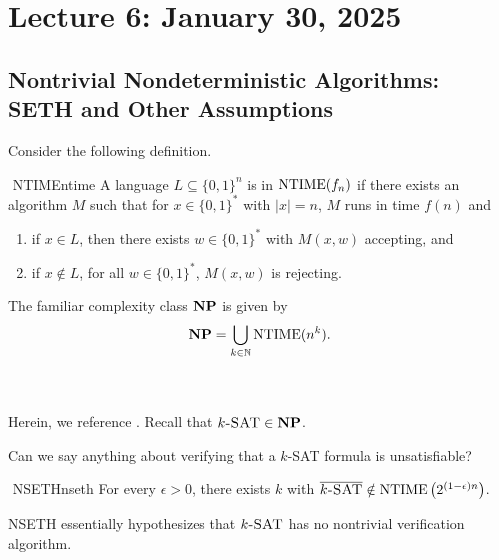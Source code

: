         
\section{Lecture 6: January 30, 2025}

    \subsection{Nontrivial Nondeterministic Algorithms: SETH and Other Assumptions}

        Consider the following definition.
        \begin{definition}{\Stop\,\,NTIME}{ntime}
            A language \(L\subseteq\{0,1\}^n\) is in \(\operatorname{NTIME}(f_n)\) if there exists an algorithm \(M\) such that for \(x\in\{0,1\}^*\) with \(|x|=n\), \(M\) runs in time \(f(n)\) and
            \begin{enumerate}
                \item if \(x\in L\), then there exists \(w\in\{0,1\}^*\) with \(M(x,w)\) accepting, and
                \item if \(x\nin L\), for all \(w\in\{0,1\}^*\), \(M(x,w)\) is rejecting.
            \end{enumerate}
        \end{definition}
        \begin{remark*}
            The familiar complexity class \(\mathbf{NP}\) is given by
            \begin{equation*}
                \mathbf{NP}=\bigcup_{k\in\mathbb{N}}\operatorname{NTIME}(n^k).
            \end{equation*}
        \end{remark*}
        \vphantom
        \\
        \\
        Herein, we reference \cite{carmosino2016nseth}. Recall that \(k\textsc{-SAT}\in\mathbf{NP}\).
        \begin{question*}
            Can we say anything about verifying that a \(k\)\textsc{-SAT} formula is unsatisfiable?
        \end{question*}
        \begin{hypothesis}{\Stop\,\,NSETH}{nseth}
            For every \(\epsilon>0\), there exists \(k\) with \(\overline{k\textsc{-SAT}}\notin\operatorname{NTIME}\left(2^{(1-\epsilon)n}\right)\).
        \end{hypothesis}
        \begin{remark*}
            NSETH essentially hypothesizes that \(k\textsc{-SAT}\) has no nontrivial verification algorithm.
        \end{remark*} 
